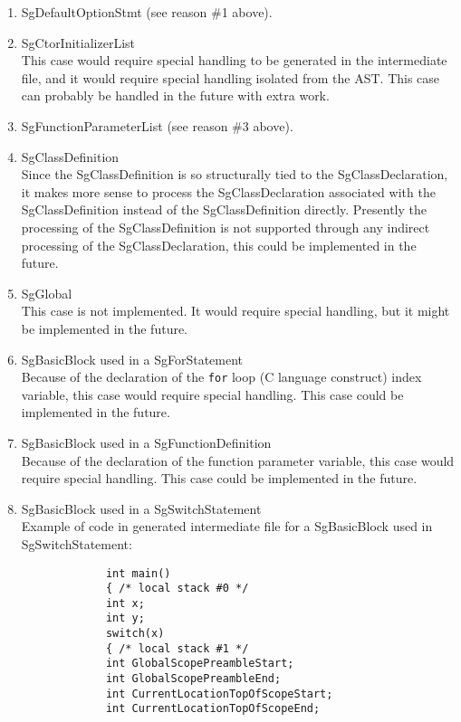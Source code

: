 \begin{enumerate}
     \item SgDefaultOptionStmt (see reason \#1 above).
     \item SgCtorInitializerList \\
        This case would require special handling to be generated in the 
        intermediate file, and it would require special handling isolated 
        from the AST.  This case can probably be handled in the future with extra work.
     \item SgFunctionParameterList (see reason \#3 above).
     \item SgClassDefinition \\
        Since the SgClassDefinition is so structurally tied to the SgClassDeclaration, 
        it makes more sense to process the SgClassDeclaration associated with the 
        SgClassDefinition instead of the SgClassDefinition directly.  Presently the 
        processing of the SgClassDefinition is not supported through any indirect 
        processing of the SgClassDeclaration, this could be implemented in the future.
     \item SgGlobal \\
        This case is not implemented. It would require special handling, but it might be 
        implemented in the future.
     \item SgBasicBlock used in a SgForStatement \\
        Because of the declaration of the {\tt for} loop (C language construct) index
        variable, this case would 
        require special handling. This case could be implemented in the future.
     \item SgBasicBlock used in a SgFunctionDefinition \\
        Because of the declaration of the function parameter variable, this case would 
        require special handling. This case could be implemented in the future.
     \item SgBasicBlock used in a SgSwitchStatement \\
        Example of code in generated intermediate file for a SgBasicBlock used in 
        SgSwitchStatement:
{\indent
{\mySmallFontSize
\begin{verbatim}
             int main()
             { /* local stack #0 */
             int x;
             int y;
             switch(x)
             { /* local stack #1 */ 
             int GlobalScopePreambleStart;
             int GlobalScopePreambleEnd;
             int CurrentLocationTopOfScopeStart;
             int CurrentLocationTopOfScopeEnd;

\end{verbatim}}}
\end{enumerate}
